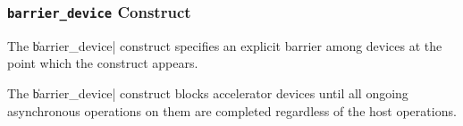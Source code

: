 
\subsubsection{{\tt barrier\_device} Construct}


The \|barrier_device| construct specifies an explicit barrier among
devices at the point which the construct appears.



The \|barrier_device| construct blocks accelerator devices until all
ongoing asynchronous operations on them are completed regardless of the
host operations. 


